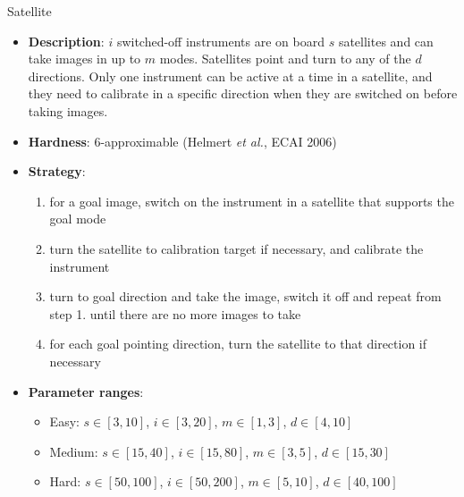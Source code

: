 \documentclass[aspectratio=169,xcolor=dvipsnames]{beamer}
\begin{document}
\begin{frame}{Satellite}
    \begin{itemize}
        \item \textbf{Description}: $i$ switched-off instruments are on board $s$ satellites and can take images in up to $m$ modes. Satellites point and turn to any of the $d$ directions. Only one instrument can be active at a time in a satellite, and they need to calibrate in a specific direction when they are switched on before taking images.
        \item \textbf{Hardness}: $6$-approximable (Helmert \textit{et al.}, ECAI 2006)
        \item \textbf{Strategy}:
        \begin{enumerate}
            \item for a goal image, switch on the instrument in a satellite that supports the goal mode
            \item turn the satellite to calibration target if necessary, and calibrate the instrument
            \item turn to goal direction and take the image, switch it off and repeat from step 1. until there are no more images to take
            \item for each goal pointing direction, turn the satellite to that direction if necessary
        \end{enumerate}
        \item \textbf{Parameter ranges}:
        \begin{itemize}
            \item Easy: $s\in[3, 10]$, $i\in[3,20]$, $m\in[1, 3]$, $d\in[4, 10]$
            \item Medium: $s\in[15, 40]$, $i\in[15,80]$, $m\in[3, 5]$, $d\in[15, 30]$
            \item Hard: $s\in[50, 100]$, $i\in[50,200]$, $m\in[5, 10]$, $d\in[40, 100]$
        \end{itemize}
    \end{itemize}
\end{frame}
\end{document}
